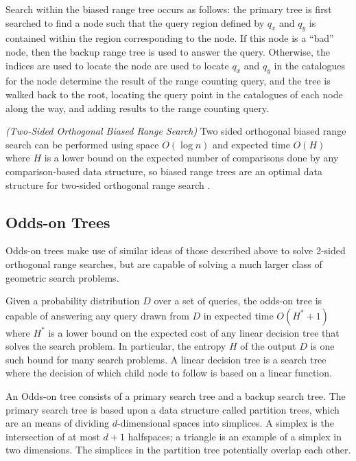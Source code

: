 \documentclass[mcs]{scsthesis}
\begin{document}
Search within the biased range tree occurs as follows: the primary tree is
first searched to find a node such that the query region defined by \(q_x\) and
\(q_y\) is contained within the region corresponding to the node. If this node
is a ``bad'' node, then the backup range tree is used to answer the query.
Otherwise, the indices are used to locate the node are used to locate \(q_x\)
and \(q_y\) in the catalogues for the node determine the result of the range
counting query, and the tree is walked back to the root, locating the query
point in the catalogues of each node along the way, and adding results to
the range counting query.

\begin{thm} \emph{(Two-Sided Orthogonal Biased Range Search)} 
Two sided orthogonal biased range search can be performed using space
\(O(\log n)\) and expected time \(O(H)\) where \(H\) is a lower bound on the
expected number of comparisons done by any comparison-based data structure, so
biased range trees are an optimal data structure for two-sided orthogonal
range search \cite{biasedrange}.
\end{thm}


\subsection{Odds-on Trees}

Odds-on trees make use of similar ideas of those described above to solve
2-sided orthogonal range searches, but are capable of solving a much larger
class of geometric search problems.

Given a probability distribution \(D\) over a set of queries, the odds-on tree
is capable of answering any query drawn from \(D\) in expected time
\(O(H^* + 1)\) where \(H^*\) is a lower bound on the expected cost of any
linear decision tree that solves the search problem. In particular, the
entropy \(H\) of the output \(D\) is one such bound for many search
problems. A linear decision tree is a search tree where the decision of which
child node to follow is based on a linear function.

An Odds-on tree consists of a primary search tree and a backup search tree.
The primary search tree is based upon a data structure called partition trees,
which are an means of dividing \(d\)-dimensional spaces into simplices. A
simplex is the intersection of at most \(d + 1\) halfspaces; a triangle is an
example of a simplex in two dimensions. The simplices in the partition tree
potentially overlap each other.
\end{document}
